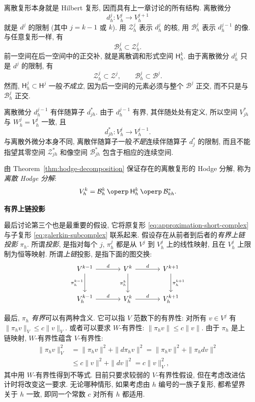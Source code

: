 离散复形本身就是 Hilbert 复形, 因而具有上一章讨论的所有结构. 离散微分
\[
d_h^j:V_h^j\to V_h^{j+1}
\]
就是 $d^j$ 的限制 (其中 $j=k-1$ 或 $k$). 用 $\mathcal Z_h^j$ 表示 $d_h^j$ 的核, 用 $\mathcal B_h^j$ 表示 $d_h^{j-1}$ 的像. 与任意复形一样, 有
\[
\mathcal B_h^j\subset\mathcal Z_h^j.
\]
前一空间在后一空间中的正交补, 就是离散调和形式空间 $\mathsf H_h^k$. 由于离散微分 $d_h^j$ 只是 $d^j$ 的限制, 有
\[
\mathcal Z_h^j\subset\mathcal Z^j,\qquad\mathcal B_h^j\subset\mathcal B^j.
\]
然而, $\mathsf H_h^j\subset\mathsf H^j$ 一般\emph{不成立}, 因为后一空间的元素必须与整个 $\mathcal B^j$ 正交, 而不只是与 $\mathcal B_h^j$ 正交.

离散微分 $d_h^{j-1}$ 有伴随算子 $d_{jh}^*$. 由于 $d_h^{j-1}$ 有界, 其伴随处处有定义, 所以空间 $V_{jh}^*$ 与 $W_h^j=V_h^j$ 一致, 且
\[
d_{jh}^*:V_h^j\to V_h^{j-1}.
\]
与离散外微分本身不同, 离散伴随算子一般\emph{不是}连续伴随算子 $d_j^*$ 的限制, 而且不能指望其零空间 $\mathcal Z_{jh}^*$ 和像空间 $\mathcal B_{jh}^*$ 包含于相应的连续空间.

由 Theorem~\ref{thm:hodge-decomposition} 保证存在的离散复形的 Hodge 分解, 称为\emph{离散 Hodge 分解}:
\begin{equation}\label{eq:discrete-hodge-decomposition}
V_h^k=\mathcal B_h^k\BookOrthSum\mathsf H_h^k\BookOrthSum\mathcal B_{kh}^*.
\end{equation}

\medskip\noindent\textbf{{有界上链投影}}\par
最后讨论第三个也是最重要的假设, 它将原复形 \eqref{eq:approximation-short-complex} 与子复形 \eqref{eq:galerkin-subcomplex} 联系起来. 假设存在从前者到后者的\emph{有界上链投影} $\pi_h$. 所谓\emph{投影}, 是指对每个 $j$, $\pi_h^j$ 都是从 $V^j$ 到 $V_h^j$ 上的线性映射, 且在 $V_h^j$ 上限制为恒等映射. 所谓\emph{上链}投影, 是指下面的图交换:
\[
\begin{tikzcd}[column sep=large,row sep=large]
V^{k-1}\arrow[r,"d"]\arrow[d,"\pi_h^{k-1}"']&V^k\arrow[r,"d"]\arrow[d,"\pi_h^k"']&V^{k+1}\arrow[d,"\pi_h^{k+1}"]\\
V_h^{k-1}\arrow[r,"d"]&V_h^k\arrow[r,"d"]&V_h^{k+1}
\end{tikzcd}
\]

最后, $\pi_h$ \emph{有界}可以有两种含义. 它可以指 $V$ 范数下的有界性: 对所有 $v\in V^j$ 有 $\|\pi_hv\|_V\leq c\|v\|_V$. 或者可以要求 $W$-有界性: $\|\pi_hv\|\leq c\|v\|$. 由于 $\pi_h$ 是上链映射, $W$-有界性蕴含 $V$-有界性:
\[
\begin{aligned}
\|\pi_hv\|_V^2&=\|\pi_hv\|^2+\|d\pi_hv\|^2=\|\pi_hv\|^2+\|\pi_hdv\|^2\\
&\leq c\|v\|^2+\|dv\|^2=c\|v\|_V^2,
\end{aligned}
\]
其中用 $W$-有界性得到不等式. 目前只要求较弱的 $V$-有界性假设, 但在考虑改进估计时将改变这一要求. 无论哪种情形, 如果考虑由 $h$ 编号的一族子复形, 都希望界关于 $h$ 一致, 即同一个常数 $c$ 对所有 $h$ 都适用.

